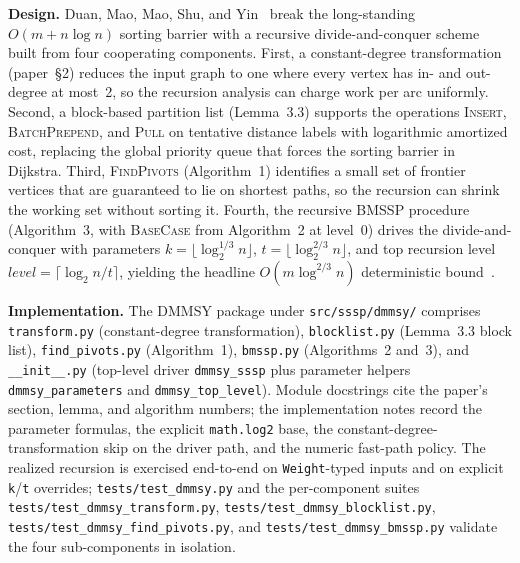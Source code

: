 \documentclass[12pt]{article}
\begin{document}
\textbf{Design.} Duan, Mao, Mao, Shu, and Yin~\cite{duan2025breaking} break the long-standing $O(m + n \log n)$ sorting barrier with a recursive divide-and-conquer scheme built from four cooperating components. First, a constant-degree transformation (paper~\S2) reduces the input graph to one where every vertex has in- and out-degree at most~2, so the recursion analysis can charge work per arc uniformly. Second, a block-based partition list (Lemma~3.3) supports the operations \textsc{Insert}, \textsc{BatchPrepend}, and \textsc{Pull} on tentative distance labels with logarithmic amortized cost, replacing the global priority queue that forces the sorting barrier in Dijkstra. Third, \textsc{FindPivots} (Algorithm~1) identifies a small set of frontier vertices that are guaranteed to lie on shortest paths, so the recursion can shrink the working set without sorting it. Fourth, the recursive \textsc{BMSSP} procedure (Algorithm~3, with \textsc{BaseCase} from Algorithm~2 at level~0) drives the divide-and-conquer with parameters $k = \lfloor \log_2^{1/3} n \rfloor$, $t = \lfloor \log_2^{2/3} n \rfloor$, and top recursion level $\mathit{level} = \lceil \log_2 n / t \rceil$, yielding the headline $O(m \log^{2/3} n)$ deterministic bound~\cite{duan2025breaking}.
\medskip

\textbf{Implementation.} The DMMSY package under \texttt{src/sssp/dmmsy/} comprises \texttt{transform.py} (constant-degree transformation), \texttt{blocklist.py} (Lemma~3.3 block list), \texttt{find\_pivots.py} (Algorithm~1), \texttt{bmssp.py} (Algorithms~2 and~3), and \texttt{\_\_init\_\_.py} (top-level driver \texttt{dmmsy\_sssp} plus parameter helpers \texttt{dmmsy\_parameters} and \texttt{dmmsy\_top\_level}). Module docstrings cite the paper's section, lemma, and algorithm numbers; the implementation notes record the parameter formulas, the explicit \texttt{math.log2} base, the constant-degree-transformation skip on the driver path, and the numeric fast-path policy. The realized recursion is exercised end-to-end on \texttt{Weight}-typed inputs and on explicit \texttt{k}/\texttt{t} overrides; \texttt{tests/test\_dmmsy.py} and the per-component suites \texttt{tests/test\_dmmsy\_transform.py}, \texttt{tests/test\_dmmsy\_blocklist.py}, \texttt{tests/test\_dmmsy\_find\_pivots.py}, and \texttt{tests/test\_dmmsy\_bmssp.py} validate the four sub-components in isolation.
\medskip
\end{document}
